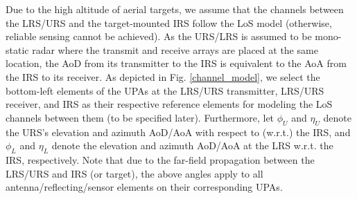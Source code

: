 \documentclass[10pt,final,doublecolumn]{IEEEtran}
\begin{document}
Due to the high altitude of aerial targets, we assume that the channels between the LRS/URS and the target-mounted IRS follow the LoS model (otherwise, reliable sensing cannot be achieved). As the URS/LRS is assumed to be
mono-static radar where the transmit and receive arrays are placed at the same location, the AoD from its transmitter to the IRS is equivalent to the AoA from the IRS to its receiver. As depicted in Fig. \ref{channel_model}, we select the bottom-left elements of the UPAs at the LRS/URS transmitter,  LRS/URS receiver, and IRS as their respective reference elements for modeling the LoS channels between them (to be specified later). Furthermore, let $\phi_{U}$ and $\eta_{U}$ denote the URS's elevation and azimuth AoD/AoA with respect to (w.r.t.) the IRS, and ${\phi}_{{L}}$ and ${\eta}_{{L}}$ denote the elevation and azimuth AoD/AoA at the LRS w.r.t. the IRS, respectively. Note that due to the far-field propagation between the LRS/URS and IRS (or target), the above angles apply to all antenna/reflecting/sensor elements on their corresponding UPAs.
\end{document}
